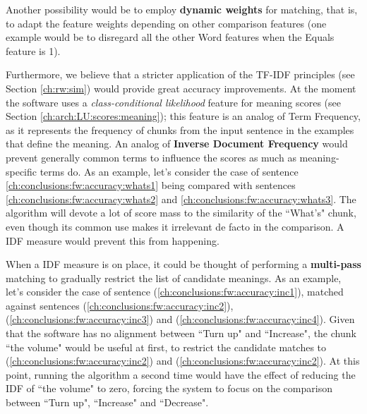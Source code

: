 Another possibility would be to employ \textbf{dynamic weights} for matching, that is, to adapt the feature weights depending on other comparison features (one example would be to disregard all the other Word features when the Equals feature is 1).

Furthermore, we believe that a stricter application of the TF-IDF principles (see Section \ref{ch:rw:sim}) would provide great accuracy improvements. At the moment the software uses a \textit{class-conditional likelihood} feature for meaning scores (see Section \ref{ch:arch:LU:scores:meaning}); this feature is an analog of Term Frequency, as it represents the frequency of chunks from the input sentence in the examples that define the meaning. An analog of \textbf{Inverse Document Frequency} would prevent generally common terms to influence the scores as much as meaning-specific terms do. As an example, let's consider the case of sentence \ref{ch:conclusions:fw:accuracy:whats1} being compared with sentences \ref{ch:conclusions:fw:accuracy:whats2} and \ref{ch:conclusions:fw:accuracy:whats3}. The algorithm will devote a lot of score mass to the similarity of the ``What's" chunk, even though its common use makes it irrelevant de facto in the comparison. A IDF measure would prevent this from happening.
 \label{ch:conclusions:fw:accuracy:whats1}
\vspace{-0.7cm}
 \label{ch:conclusions:fw:accuracy:whats2}
\vspace{-0.7cm}
 \label{ch:conclusions:fw:accuracy:whats3}

When a IDF measure is on place, it could be thought of performing a \textbf{multi-pass} matching to gradually restrict the list of candidate meanings. As an example, let's consider the case of sentence (\ref{ch:conclusions:fw:accuracy:inc1}), matched against sentences (\ref{ch:conclusions:fw:accuracy:inc2}), (\ref{ch:conclusions:fw:accuracy:inc3}) and (\ref{ch:conclusions:fw:accuracy:inc4}). Given that the software has no alignment between ``Turn up" and ``Increase", the chunk ``the volume" would be useful at first, to restrict the candidate matches to (\ref{ch:conclusions:fw:accuracy:inc2}) and (\ref{ch:conclusions:fw:accuracy:inc2}). At this point, running the algorithm a second time would have the effect of reducing the IDF of ``the volume" to zero, forcing the system to focus on the comparison between ``Turn up", ``Increase" and ``Decrease".

 \label{ch:conclusions:fw:accuracy:inc1}
\vspace{-0.7cm}
 \label{ch:conclusions:fw:accuracy:inc2}
\vspace{-0.7cm}
 \label{ch:conclusions:fw:accuracy:inc3}
\vspace{-0.7cm}
 \label{ch:conclusions:fw:accuracy:inc4}

